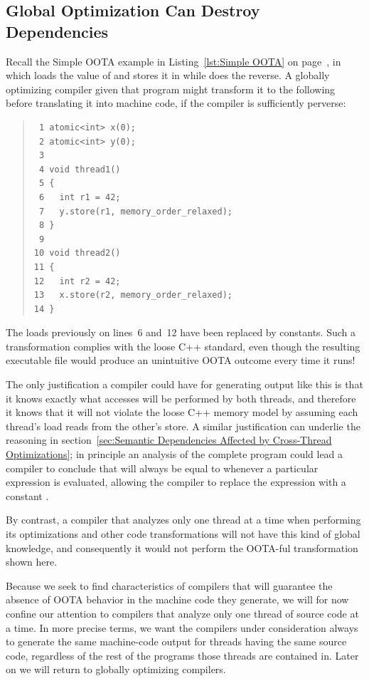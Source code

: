 \documentclass[10]{article}
\begin{document}
\subsection{Global Optimization Can Destroy Dependencies}
\label{sec:Global Optimization Can Destroy Dependencies}

Recall the Simple OOTA example in Listing~\ref{lst:Simple OOTA} on
page~\pageref{lst:Simple OOTA},
in which  loads the value of  and stores it in
 while  does the reverse.
A globally optimizing compiler given that program might
transform it to the following before translating it into machine code,
if the compiler is sufficiently perverse:
\begin{quote}
\begin{verbatim}
 1 atomic<int> x(0);
 2 atomic<int> y(0);
 3
 4 void thread1()
 5 {
 6   int r1 = 42;
 7   y.store(r1, memory_order_relaxed);
 8 }
 9
10 void thread2()
11 {
12   int r2 = 42;
13   x.store(r2, memory_order_relaxed);
14 }
\end{verbatim}
\end{quote}
The loads previously on lines~6 and~12 have been replaced by constants.
Such a transformation complies with the loose C++ standard,
even though the resulting executable file would produce an unintuitive
OOTA outcome every time it runs!

The only justification a compiler could have for generating output like
this is that it knows exactly what accesses will be performed by both
threads, and therefore it knows that it will not violate the loose C++
memory model by assuming each thread's load reads from the other's
store.
A similar justification can underlie the reasoning in
section~\ref{sec:Semantic Dependencies Affected by Cross-Thread Optimizations};
in principle an analysis of the complete program could lead a compiler
to conclude that  will always be equal to  whenever a
particular  expression is evaluated, allowing the compiler
to replace the expression with a constant .

By contrast, a compiler that analyzes only one thread at a time when
performing its optimizations and other code transformations will not
have this kind of global knowledge, and consequently it would not
perform the OOTA-ful transformation shown here.

Because we seek to find characteristics of compilers that will
guarantee the absence of OOTA behavior in the machine code they generate,
we will for now confine our attention to compilers that analyze only
one thread of source code at a time.
In more precise terms, we want the compilers under consideration
always to generate the same machine-code output for threads having
the same source code, regardless of the rest of the programs
those threads are contained in.
Later on we will return to globally optimizing compilers.
\end{document}
